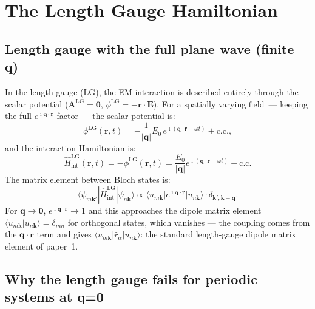 \documentclass[11pt]{article}
\newcommand{\iunit}{\imath}          %
\newcommand{\Avec}{\mathbf{A}}
\begin{document}
\section{The Length Gauge Hamiltonian}

\subsection{Length gauge with the full plane wave (finite q)}

In the length gauge (LG), the EM interaction is described entirely
through the scalar potential ($\Avec^\mathrm{LG}=\mathbf{0}$,
$\phi^\mathrm{LG}=-\mathbf{r}\cdot\mathbf{E}$).
For a spatially varying field~--- keeping the full
$e^{\iunit\mathbf{q}\cdot\mathbf{r}}$ factor --- the scalar
potential is:
\begin{equation}
  \phi^\mathrm{LG}(\mathbf{r},t)
  = -\frac{1}{|\mathbf{q}|}
    E_0\,e^{\iunit(\mathbf{q}\cdot\mathbf{r}-\omega t)}
    + \text{c.c.},
  \label{eq:phi-LG-finiteq}
\end{equation}
and the interaction Hamiltonian is:
\begin{equation}
  \hat{H}_\mathrm{int}^\mathrm{LG}(\mathbf{r},t)
  = -\phi^\mathrm{LG}(\mathbf{r},t)
  = \frac{E_0}{|\mathbf{q}|}
    e^{\iunit(\mathbf{q}\cdot\mathbf{r}-\omega t)}
    + \text{c.c.}
  \label{eq:HLG-finiteq}
\end{equation}
The matrix element between Bloch states is:
\begin{equation}
  \langle\psi_{m\mathbf{k}'}|
  \hat{H}_\mathrm{int}^\mathrm{LG}
  |\psi_{n\mathbf{k}}\rangle
  \propto
  \langle u_{m\mathbf{k}}|e^{\iunit\mathbf{q}\cdot\mathbf{r}}|u_{n\mathbf{k}}\rangle
  \cdot\delta_{\mathbf{k}',\mathbf{k}+\mathbf{q}}.
  \label{eq:HLG-me}
\end{equation}
For $\mathbf{q}\to\mathbf{0}$, $e^{\iunit\mathbf{q}\cdot\mathbf{r}}\to 1$
and this approaches the dipole matrix element
$\langle u_{m\mathbf{k}}|u_{n\mathbf{k}}\rangle = \delta_{mn}$
for orthogonal states, which vanishes --- the coupling comes from
the $\mathbf{q}\cdot\mathbf{r}$ term and gives
$\langle u_{m\mathbf{k}}|\hat{r}_\alpha|u_{n\mathbf{k}}\rangle$:
the standard length-gauge dipole matrix element of paper~1.

\subsection{Why the length gauge fails for periodic systems at q=0}
\end{document}
